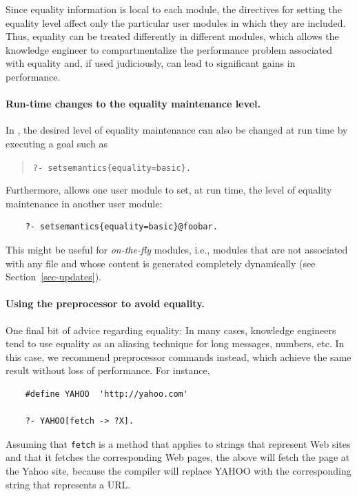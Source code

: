 \documentclass[11pt]{article}
\newcommand{\ERGO}{\mbox{\smaller{\ensuremath{\cal{E}}\smaller{{\sc{RGO}}}}}\xspace}
\newcommand{\FLSYSTEM}{\ERGO}
\begin{document}
Since equality information is local to each module, the directives for
setting the equality level affect only the particular user modules in which
they are included.  Thus, equality can be treated differently in different
modules, which allows the knowledge engineer to compartmentalize the performance
problem associated with equality and, if used judiciously, can lead to
significant gains in performance.

\paragraph{Run-time changes to the equality maintenance level.}
In \FLSYSTEM, the desired level of equality maintenance can also be changed at
run time by executing a goal such as
\begin{quote}
 {\tt ?- setsemantics\{equality=basic\}.}
\end{quote}
Furthermore, \FLSYSTEM allows one user module to set, at run time, the level
of equality maintenance in another user module:
\begin{verbatim}
    ?- setsemantics{equality=basic}@foobar.
\end{verbatim}
This might be useful for \emph{on-the-fly} modules, i.e., modules that
are not associated with any file and whose content is generated completely
dynamically (see Section~\ref{sec-updates}).

\paragraph{Using the preprocessor to avoid equality.}
One final bit of advice regarding equality: In many cases, knowledge
engineers tend to use
equality as an aliasing technique for long messages, numbers, etc. In this
case, we recommend preprocessor commands instead, which achieve the same
result without loss of performance. For instance,

\begin{verbatim}
    #define YAHOO  'http://yahoo.com'  

    ?- YAHOO[fetch -> ?X].
\end{verbatim}
\noindent
Assuming that {\tt fetch} is a method that applies to strings that
represent Web sites and that it fetches the corresponding Web pages, the above
will fetch the page at the Yahoo site, because the \FLSYSTEM compiler will
replace YAHOO with the corresponding string that represents a URL.
\end{document}
